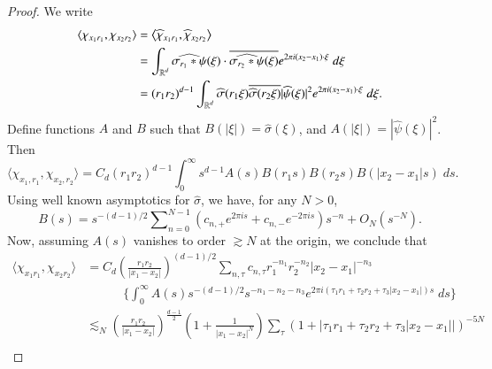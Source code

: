\begin{proof}
%
    We write
    \begin{align*}
        \langle \chi_{x_1 r_1}, \chi_{x_2 r_2} \rangle &= \left\langle \widehat{\chi}_{x_1 r_1}, \widehat{\chi}_{x_2 r_2} \right\rangle\\
        &= \int_{\operatorname{\mathbb{R}}^d} \widehat{\sigma_{r_1} * \psi}(\xi) \cdot \overline{\widehat{\sigma_{r_2} * \psi}(\xi)} e^{2 \pi i (x_2 - x_1) \cdot \xi}\; d\xi\\
        &= (r_1 r_2)^{d-1} \int_{\operatorname{\mathbb{R}}^d} \widehat{\sigma}(r_1 \xi) \overline{\widehat{\sigma}(r_2 \xi)} |\widehat{\psi}(\xi)|^2 e^{2 \pi i (x_2 - x_1) \cdot \xi}\; d\xi.
    \end{align*}
    Define functions $A$ and $B$ such that $B(|\xi|) = \widehat{\sigma}(\xi)$, and $A(|\xi|) = |\widehat{\psi}(\xi)|^2$. Then
    \[ \langle \chi_{x_1, r_1}, \chi_{x_2, r_2} \rangle = C_d (r_1r_2)^{d-1} \int_0^\infty s^{d-1} A(s) B(r_1 s) B(r_2 s) B(|x_2 - x_1| s)\; ds. \]
    Using well known asymptotics for $\widehat{\sigma}$, we have, for any $N > 0$,
    \[ B(s) = s^{-(d-1)/2} \sum\nolimits_{n = 0}^{N-1} (c_{n,+} e^{2 \pi i s} + c_{n,-} e^{-2 \pi i s}) s^{-n} + O_N(s^{-N}). \]
    Now, assuming $A(s)$ vanishes to order $\gtrsim N$ at the origin, we conclude that
    \begin{align*}
        \langle \chi_{x_1 r_1}, \chi_{x_2 r_2} \rangle &= C_d \left( \frac{r_1r_2}{|x_1 - x_2|} \right)^{(d-1)/2} \sum\nolimits_{n,\tau} c_{n,\tau}  r_1^{-n_1} r_2^{-n_2} |x_2 - x_1|^{-n_3}\\
        &\quad\quad\quad \Bigg\{ \int_0^\infty A(s) s^{-(d-1)/2}  s^{-n_1-n_2-n_3} e^{2 \pi i (\tau_1 r_1 + \tau_2 r_2 + \tau_3 |x_2 - x_1|) s}\; ds \Bigg\}\\
        &\lesssim_N \left( \frac{r_1r_2}{|x_1 - x_2|} \right)^{\frac{d-1}{2}} \left(1 + \frac{1}{|x_1 - x_2|^N} \right) \sum\nolimits_{\tau} \left( 1 + |\tau_1 r_1 + \tau_2 r_2 + \tau_3 |x_2 - x_1|| \right)^{-5N}\\

\end{align*}
\end{proof}
